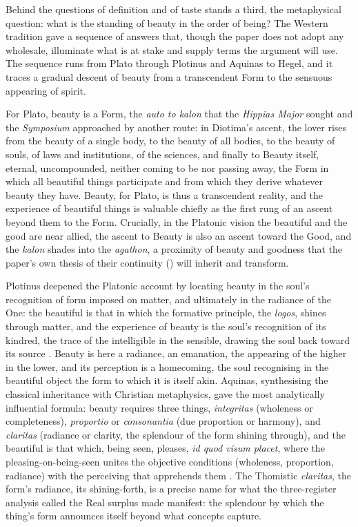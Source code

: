 Behind the questions of definition and of taste stands a third, the metaphysical question: what is the standing of beauty in the order of being? The Western tradition gave a sequence of answers that, though the paper does not adopt any wholesale, illuminate what is at stake and supply terms the argument will use. The sequence runs from Plato through Plotinus and Aquinas to Hegel, and it traces a gradual descent of beauty from a transcendent Form to the sensuous appearing of spirit.

For Plato, beauty is a Form, the \emph{auto to kalon} that the \emph{Hippias Major} sought and the \emph{Symposium} approached by another route: in Diotima's ascent, the lover rises from the beauty of a single body, to the beauty of all bodies, to the beauty of souls, of laws and institutions, of the sciences, and finally to Beauty itself, eternal, uncompounded, neither coming to be nor passing away, the Form in which all beautiful things participate and from which they derive whatever beauty they have. Beauty, for Plato, is thus a transcendent reality, and the experience of beautiful things is valuable chiefly as the first rung of an ascent beyond them to the Form. Crucially, in the Platonic vision the beautiful and the good are near allied, the ascent to Beauty is also an ascent toward the Good, and the \emph{kalon} shades into the \emph{agathon}, a proximity of beauty and goodness that the paper's own thesis of their continuity () will inherit and transform.

Plotinus deepened the Platonic account by locating beauty in the soul's recognition of form imposed on matter, and ultimately in the radiance of the One: the beautiful is that in which the formative principle, the \emph{logos}, shines through matter, and the experience of beauty is the soul's recognition of its kindred, the trace of the intelligible in the sensible, drawing the soul back toward its source \parencite{plotinus1991}. Beauty is here a radiance, an emanation, the appearing of the higher in the lower, and its perception is a homecoming, the soul recognising in the beautiful object the form to which it is itself akin. Aquinas, synthesising the classical inheritance with Christian metaphysics, gave the most analytically influential formula: beauty requires three things, \emph{integritas} (wholeness or completeness), \emph{proportio} or \emph{consonantia} (due proportion or harmony), and \emph{claritas} (radiance or clarity, the splendour of the form shining through), and the beautiful is that which, being seen, pleases, \emph{id quod visum placet}, where the pleasing-on-being-seen unites the objective conditions (wholeness, proportion, radiance) with the perceiving that apprehends them \parencite{aquinas1981}. The Thomistic \emph{claritas}, the form's radiance, its shining-forth, is a precise name for what the three-register analysis called the Real surplus made manifest: the splendour by which the thing's form announces itself beyond what concepts capture.

